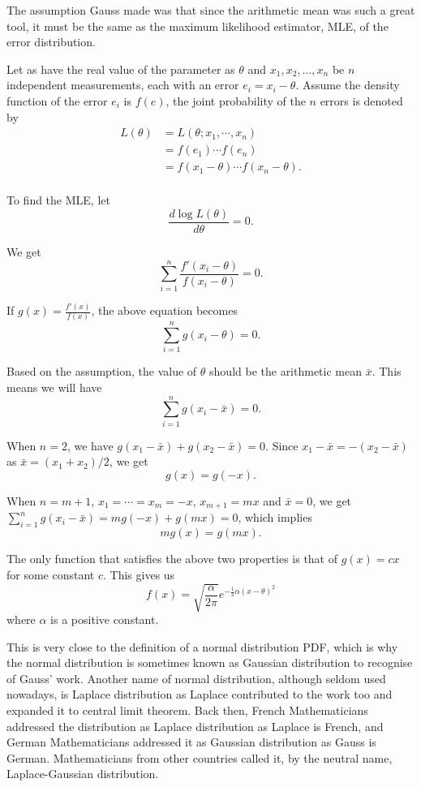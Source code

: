 \documentclass[11pt, a4paper, oneside]{book}
\theoremstyle{definition}
\begin{document}
\noindent The assumption Gauss made was that since the arithmetic mean was such a great tool, it must be the same as the maximum likelihood estimator, MLE, of the error distribution. 

\noindent Let as have the real value of the parameter as $\theta$ and $x_1, x_2, \dots, x_n$ be $n$ independent measurements, each with an error $e_i = x_i - \theta$. Assume the density function of the error $e_i$ is $f(e)$, the joint probability of the $n$ errors is denoted by
\begin{equation*}
\begin{split}
L(\theta) &= L(\theta ; x_1, \cdots, x_n) \\
&= f(e_1) \cdots f(e_n) \\
&= f(x_1 - \theta) \cdots f(x_n - \theta). \\
\end{split}
\end{equation*}

\noindent To find the MLE, let\[
\frac{d \log L(\theta)}{d\theta} = 0.
\]

\noindent We get \[
\sum_{i=1}^{n} \frac{f'(x_i - \theta)}{f(x_i - \theta)} = 0.
\]

\noindent If $g(x) = \frac{f'(x)}{f(x)}$, the above equation becomes \[
\sum_{i=1}^{n} g(x_i - \theta) = 0.
\]

\noindent Based on the assumption, the value of $\theta$ should be the arithmetic mean $\bar{x}$. This means we will have\[
\sum_{i=1}^{n} g(x_i - \bar{x}) = 0.
\]

\noindent When $n = 2$, we have $g(x_1 - \bar{x}) + g(x_2 - \bar{x}) = 0$. Since $x_1 - \bar{x} = - (x_2 - \bar{x})$ as $\bar{x} = (x_1 + x_2) / 2$, we get \[
g(x) = g(-x).
\]

\noindent When $n = m+1$, $x_1 = \cdots = x_m = -x$, $x_{m+1} = mx$ and $\bar{x} = 0$, we get $\sum_{i=1}^{n} g(x_i - \bar{x}) = mg(-x) + g(mx) =0$, which implies \[
mg(x) = g(mx).
\]

\noindent The only function that satisfies the above two properties is that of $g(x) = cx$ for some constant $c$. This gives us\[
f(x) = \sqrt{\frac{\alpha}{2\pi}} e^{-\frac{1}{2}\alpha(x-\theta)^2}
\]
where $\alpha$ is a positive constant.

\noindent This is very close to the definition of a normal distribution PDF, which is why the normal distribution is sometimes known as Gaussian distribution to recognise of Gauss' work. Another name of normal distribution, although seldom used nowadays, is Laplace distribution as Laplace contributed to the work too and expanded it to central limit theorem. Back then, French Mathematicians addressed the distribution as Laplace distribution as Laplace is French, and German Mathematicians addressed it as Gaussian distribution as Gauss is German. Mathematicians from other countries called it, by the neutral name, Laplace-Gaussian distribution. 
\end{document}
